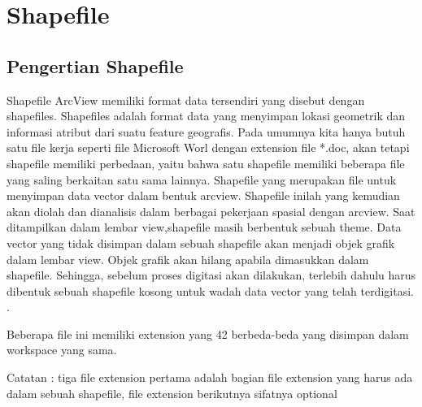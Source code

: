 \section{Shapefile}
\subsection{Pengertian Shapefile}
Shapefile ArcView memiliki format data tersendiri yang disebut dengan shapefiles. 
Shapefiles adalah format data yang menyimpan lokasi geometrik dan informasi atribut dari suatu feature geografis. 
Pada umumnya kita hanya butuh satu file kerja seperti file Microsoft Worl dengan extension file *.doc, 
akan tetapi shapefile memiliki perbedaan, yaitu bahwa satu shapefile memiliki beberapa file yang saling berkaitan satu sama lainnya. Shapefile yang merupakan file untuk menyimpan data vector dalam bentuk arcview. Shapefile inilah yang kemudian akan diolah dan dianalisis dalam berbagai pekerjaan spasial dengan arcview. Saat ditampilkan dalam lembar view,shapefile masih berbentuk sebuah theme. Data vector yang tidak disimpan dalam sebuah shapefile akan menjadi objek grafik dalam lembar view. Objek grafik akan hilang apabila dimasukkan dalam shapefile. Sehingga, sebelum proses digitasi akan dilakukan, terlebih dahulu harus dibentuk sebuah shapefile kosong untuk wadah data vector yang telah terdigitasi.
. 


Beberapa file ini memiliki extension yang 42 berbeda-beda yang disimpan dalam workspace yang sama.


Catatan : tiga file extension pertama adalah bagian file extension yang harus ada dalam sebuah shapefile, file extension berikutnya sifatnya optional
